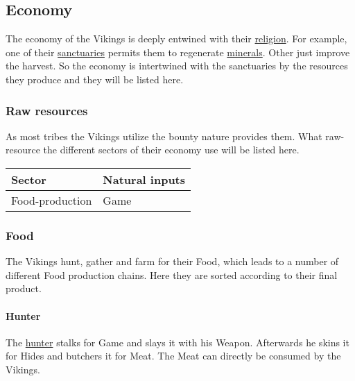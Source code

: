 \subsection{Economy}\label{ch:Tribes:Vikings:Economy}
The economy of the \gls*{Vikings} is deeply entwined with their
\hyperref[ch:Tribes:Vikings:Religion]{religion}. For example, one of their
\hyperref[ch:Tribes:Vikings:Religion:Mountain]{sanctuaries} permits them to
regenerate \hyperref[ch:Goods:Nature:Minerals]{minerals}. Other just improve
the harvest. So the economy is intertwined with the sanctuaries by the
resources they produce and they will be listed here.

\subsubsection{Raw resources}\label{ch:Tribes:Vikings:Economy:RawInputs}
As most tribes the \gls*{Vikings} utilize the bounty nature provides them. What
raw-resource the different sectors of their economy use will be listed here.

\begin{longtable}{ll}
	\toprule
	Sector                & Natural inputs \\
	\midrule
	\Gls{Food}-production & \Gls{Game}     \\
	\bottomrule
\end{longtable}

\subsubsection{Food}\label{ch:Tribes:Vikings:Economy:Food}
The \gls*{Vikings} hunt, gather and farm for their \gls{Food}, which leads to a
number of different \gls{Food} production chains. Here they are sorted
according to their final product.

\paragraph{Hunter}
The \hyperref[ch:Tribes:Vikings:Professions]{hunter} stalks for \gls{Game} and
slays it with his \gls{Weapon}. Afterwards he skins it for \glspl{Hide} and
butchers it for \gls{Meat}. The \gls{Meat} can directly be consumed by the
\gls{Vikings}.


